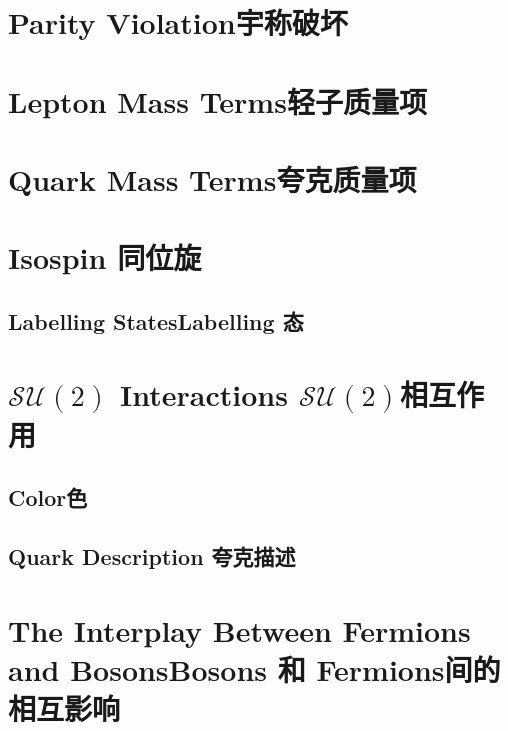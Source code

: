 \section[宇称破坏]{Parity Violation\quad 宇称破坏}\label{sec7.4}

\section[轻子质量项]{Lepton Mass Terms\quad 轻子质量项}\label{sec7.5}

\section[夸克质量项]{Quark Mass Terms\quad 夸克质量项}\label{sec7.6}

\section[同位旋]{Isospin \quad 同位旋}\label{sec7.7}

\subsection[Labelling 态]{Labelling States\quad Labelling 态}\label{sec7.7.1}

\section[$\mathcal{SU}(3)$相互作用]{$\mathcal{SU}(2)$ Interactions \quad $\mathcal{SU}(2)$相互作用}\label{sec7.8}

\subsection[色]{Color\quad 色}\label{sec7.8.1}

\subsection[夸克描述]{Quark Description \quad 夸克描述}\label{sec7.8.2}

\section[Bosons 和 Fermions 间的相互影响]{The Interplay Between Fermions and Bosons\quad Bosons 和 Fermions间的相互影响}\label{sec7.9}
